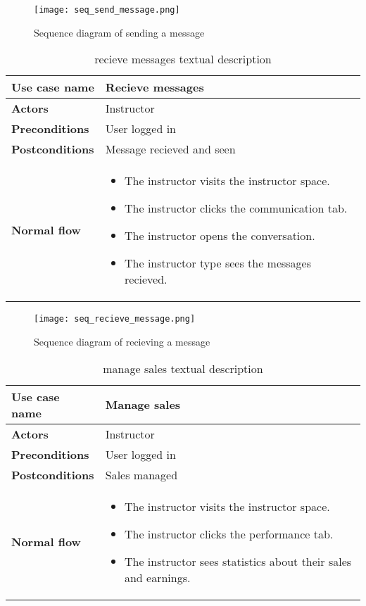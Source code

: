 \begin{figure}[!ht]
    \centering
    \texttt{[image: seq\_send\_message.png]}
    \caption{Sequence diagram of sending a message}
    \label{fig:seq_send_message}
\end{figure}

\begin{table}[H]
\centering
\caption{recieve messages textual description}
\begin{tabular}{|p{4cm}|p{10cm}|}
\hline
\textbf{\large{Use case name}} & Recieve messages \\\hline
\textbf{\large{Actors}} & Instructor \\\hline
\textbf{\large{Preconditions}} & User logged in \\\hline
\textbf{\large{Postconditions}} & Message recieved and seen \\\hline
\textbf{\large{Normal flow}} & 
\begin{itemize}
  \item The instructor visits the instructor space.
  \item The instructor clicks the communication tab.
  \item The instructor opens the conversation.
  \item The instructor type sees the messages recieved.
\end{itemize}
\\\hline

\end{tabular}
\end{table}

\begin{figure}[!ht]
    \centering
    \texttt{[image: seq\_recieve\_message.png]}
    \caption{Sequence diagram of recieving a message}
    \label{fig:seq_recieve_message}
\end{figure}

\begin{table}[H]
\centering
\caption{manage sales textual description}
\begin{tabular}{|p{4cm}|p{10cm}|}
\hline
\textbf{\large{Use case name}} & Manage sales \\\hline
\textbf{\large{Actors}} & Instructor \\\hline
\textbf{\large{Preconditions}} & User logged in \\\hline
\textbf{\large{Postconditions}} & Sales managed  \\\hline
\textbf{\large{Normal flow}} & 
\begin{itemize}
  \item The instructor visits the instructor space.
  \item The instructor clicks the performance tab.
  \item The instructor sees statistics about their sales and earnings.
\end{itemize}
\\\hline

\end{tabular}
\end{table}


